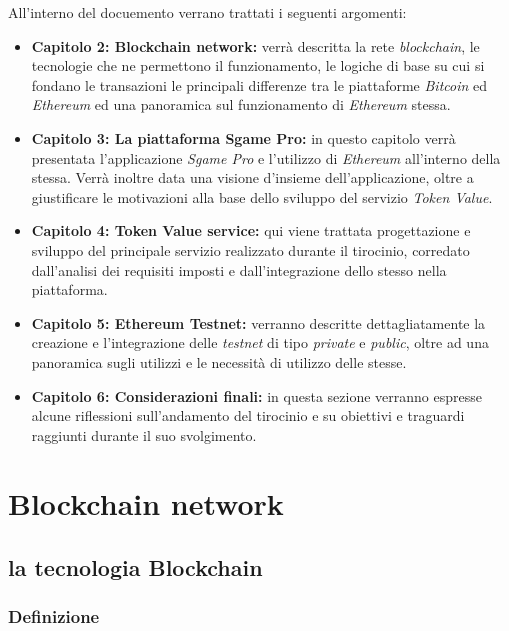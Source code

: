 \documentclass[11pt]{thesistemp}
\begin{document}
All'interno del docuemento verrano trattati i seguenti argomenti: 
\begin{itemize}
	\item \textbf{Capitolo 2: Blockchain network:} verrà descritta la rete \textit{blockchain}, le tecnologie che ne permettono il funzionamento, le logiche di base su cui si fondano le transazioni le principali differenze tra le piattaforme \textit{Bitcoin} ed \textit{Ethereum} ed una panoramica sul funzionamento di \textit{Ethereum} stessa.
	\item \textbf{Capitolo 3: La piattaforma Sgame Pro:} in questo capitolo verrà presentata l'applicazione \textit{Sgame Pro} e l'utilizzo di \textit{Ethereum} all'interno della stessa. Verrà inoltre data una visione d'insieme dell'applicazione, oltre a giustificare le motivazioni alla base dello sviluppo del servizio \textit{Token Value}.
	\item \textbf{Capitolo 4: Token Value service:} qui viene trattata progettazione e sviluppo del principale servizio realizzato durante il tirocinio, corredato dall'analisi dei requisiti imposti e dall'integrazione dello stesso nella piattaforma.
	\item \textbf{Capitolo 5: Ethereum Testnet:} verranno descritte dettagliatamente la creazione e l'integrazione delle \textit{testnet} di tipo \textit{private} e \textit{public}, oltre ad una panoramica sugli utilizzi e le necessità di utilizzo delle stesse.
	\item \textbf{Capitolo 6: Considerazioni finali:} in questa sezione verranno espresse alcune riflessioni sull'andamento del tirocinio e su obiettivi e traguardi raggiunti durante il suo svolgimento.
\end{itemize}

\pagebreak
\section{Blockchain network}

\subsection{la tecnologia Blockchain}

\subsubsection{Definizione}
\end{document}
